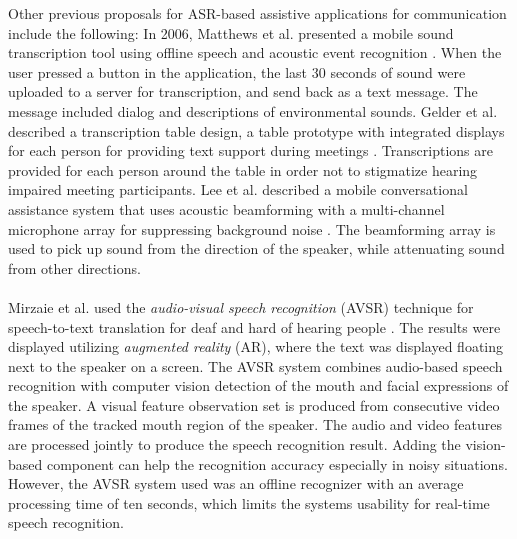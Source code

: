 \documentclass[english, 12pt, a4paper, pdftex, elec, utf8]{aaltothesis}
\begin{document}
Other previous proposals for ASR-based assistive applications for communication include the following: In 2006, Matthews et al. presented a mobile sound transcription tool using offline speech and acoustic event recognition  \cite{matthews2006scribe4me}. When the user pressed a button in the application, the last 30 seconds of sound were uploaded to a server for transcription, and send back as a text message. The message included dialog and descriptions of environmental sounds. Gelder et al. described a transcription table design, a table prototype with integrated displays for each person for providing text support during meetings \cite{van2005transcription}. Transcriptions are provided for each person around the table in order not to stigmatize hearing impaired meeting participants. Lee et al. described a mobile conversational assistance system that uses acoustic beamforming with a multi-channel microphone array for suppressing background noise \cite{lee2013dialogue}. The beamforming array is used to pick up sound from the direction of the speaker, while attenuating sound from other directions. \\\\
Mirzaie et al. used the \textit{audio-visual speech recognition} (AVSR) technique for speech-to-text translation for deaf and hard of hearing people \cite{mirzaei2012combining}. The results were displayed utilizing \textit {augmented reality} (AR), where the text was displayed floating next to the speaker on a screen. The AVSR system combines audio-based speech recognition with computer vision detection of the mouth and facial expressions of the speaker. A visual feature observation set is produced from consecutive video frames of the tracked mouth region of the speaker. The audio and video features are processed jointly to produce the speech recognition result. Adding the vision-based component can help the recognition accuracy especially in noisy situations. However, the AVSR system used was an offline recognizer with an average processing time of ten seconds, which limits the systems usability for real-time speech recognition. \\\\
\end{document}
